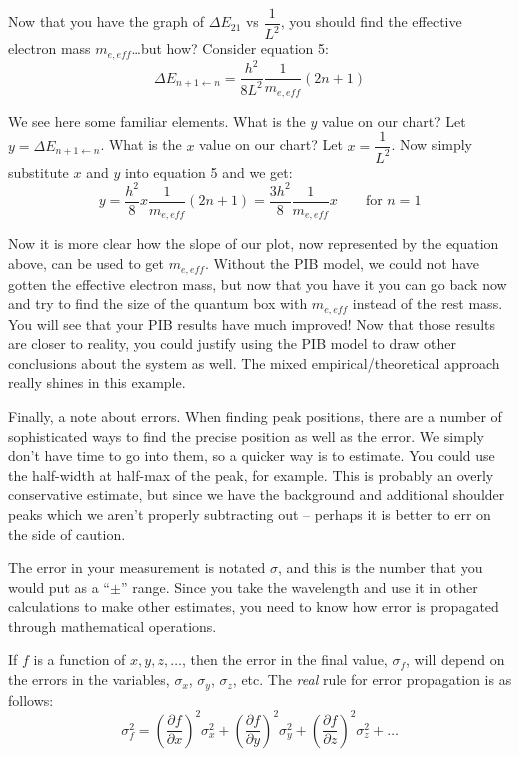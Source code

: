 \documentclass[12pt, openany, letterpaper]{memoir}
\begin{document}
Now that you have the graph of $\Delta E_{21}$ vs $\dfrac{1}{L^2}$, you should find the effective electron mass $m_{e,eff}$\ldots but how? Consider equation 5:
\begin{equation*}
	\Delta E_{n+1\leftarrow n} = \frac{h^2}{8L^2}\frac{1}{m_{e,eff}}(2n+1)
\end{equation*}
 
 We see here some familiar elements. What is the $y$ value on our chart? Let $y=\Delta E_{n+1\leftarrow n}$. What is the $x$ value on our chart? Let $x=\dfrac{1}{L^2}$. Now simply substitute $x$ and $y$ into equation 5 and we get:
 \begin{equation*}
	y=\frac{h^2}{8}x\frac{1}{m_{e,eff}}(2n+1) = \frac{3h^2}{8}\frac{1}{m_{e,eff}}x \hspace{2em}\text{for }n=1
 \end{equation*}
 
 Now it is more clear how the slope of our plot, now represented by the equation above, can be used to get $m_{e,eff}$. Without the PIB model, we could not have gotten the effective electron mass, but now that you have it you can go back now and try to find the size of the quantum box with $m_{e,eff}$ instead of the rest mass. You will see that your PIB results have much improved! Now that those results are closer to reality, you could justify using the PIB model to draw other conclusions about the system as well. The mixed empirical/theoretical approach really shines in this example.
 
 Finally, a note about errors. When finding peak positions, there are a number of sophisticated ways to find the precise position as well as the error. We simply don't have time to go into them, so a quicker way is to estimate. You could use the half-width at half-max of the peak, for example. This is probably an overly conservative estimate, but since we have the background and additional shoulder peaks which we aren't properly subtracting out -- perhaps it is better to err on the side of caution.
 
 The error in your measurement is notated $\sigma$, and this is the number that you would put as a ``$\pm$'' range. Since you take the wavelength and use it in other calculations to make other estimates, you need to know how error is propagated through mathematical operations.
 
 If $f$ is a function of $x, y, z,\ldots$, then the error in the final value, $\sigma_f$, will depend on the errors in the variables, $\sigma_x$, $\sigma_y$, $\sigma_z$, etc. The \emph{real} rule for error propagation is as follows:
 \begin{equation*}
	 \sigma_f^2 = \left(\frac{\partial f}{\partial x}\right)^2\sigma_x^2 + \left(\frac{\partial f}{\partial y}\right)^2\sigma_y^2 + \left(\frac{\partial f}{\partial z}\right)^2\sigma_z^2 + \ldots
 \end{equation*}
 
\end{document}
